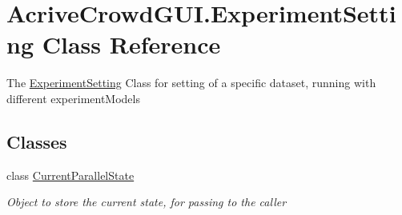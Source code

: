 \hypertarget{class_acrive_crowd_g_u_i_1_1_experiment_setting}{}\section{Acrive\+Crowd\+G\+U\+I.\+Experiment\+Setting Class Reference}
\label{class_acrive_crowd_g_u_i_1_1_experiment_setting}


The \hyperlink{class_acrive_crowd_g_u_i_1_1_experiment_setting}{Experiment\+Setting} Class for setting of a specific dataset, running with different experiment\+Models  


\subsection*{Classes}
\begin{DoxyCompactItemize}
\item 
class \hyperlink{class_acrive_crowd_g_u_i_1_1_experiment_setting_1_1_current_parallel_state}{Current\+Parallel\+State}
\begin{DoxyCompactList}\small\item\em Object to store the current state, for passing to the caller \end{DoxyCompactList}\end{DoxyCompactItemize}
